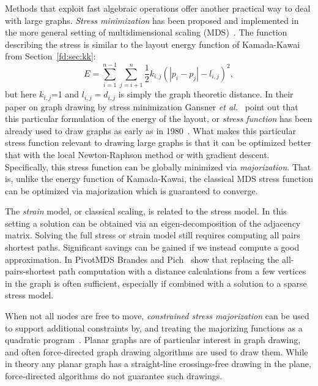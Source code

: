 \documentclass[notitlepage,letter,11pt]{article}
\begin{document}
Methods that exploit fast algebraic operations offer another practical
way to deal with large graphs. {\em Stress
  minimization} has been proposed and implemented in the more general
setting of multidimensional scaling (MDS)~\cite{oldKruskalMDS}. The
function describing the stress is similar to the layout energy function of Kamada-Kawai from
Section~\ref{fd:sec:kk}:
$$E=\sum_{i=1}^{n-1}\sum_{j=i+1}^{n}\frac{1}{2}k_{i,j}(|p_i-p_j|-l_{i,j})^2,$$
but here $k_{i,j}$=1 and $l_{i,j}=d_{i,j}$ is simply the graph
theoretic distance. In their paper on graph drawing by stress
minimization Gansner {\em et al.}~\cite{gkn-gdsm-04} point out that this
particular formulation of the energy of the layout, or {\em stress
  function} has been already used to draw graphs as early as in
1980~\cite{ks-dnd-80}. What makes this particular stress function relevant to drawing large
graphs is that it can be optimized better that
with the local Newton-Raphson method or with gradient descent. Specifically, this stress function can
be globally minimized via {\em majorization}. That is, unlike the
energy function of Kamada-Kawai, the classical MDS stress function can
be optimized via majorization which is guaranteed to converge.

The {\em strain} model, or classical scaling, is related to the stress
model. In this setting a solution can be obtained via an
eigen-decomposition of the adjacency matrix. Solving the full stress or strain model still requires computing all pairs
shortest paths. Significant savings can be gained if we instead
compute a good approximation. In PivotMDS Brandes and
Pich~\cite{bp-pmds-06} show that replacing the all-pairs-shortest path
computation with a distance calculations from a few vertices in the
graph is often sufficient, especially if combined with a solution to a
sparse stress model. 

When not all nodes are free to move, {\em constrained
stress majorization} can be used to support additional constraints by,
and treating the majorizing functions as a quadratic program~\cite{DBLP:journals/dm/DwyerKM09}.
Planar graphs are of particular interest in graph drawing, and often
force-directed graph drawing algorithms are used to draw
them. While in theory any planar graph has a straight-line
crossings-free drawing in the plane, force-directed algorithms do not
guarantee such drawings. 
\end{document}
